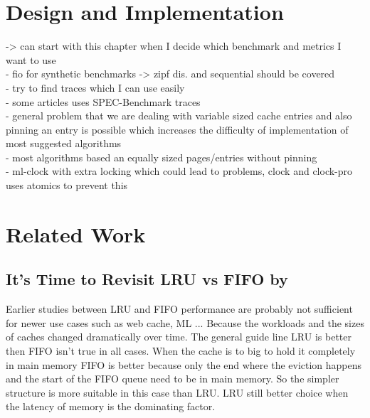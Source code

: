 \documentclass[
	12pt,
	a4paper,
	abstract,
	bibliography=totoc,
	chapterprefix,
	headings=openright,
	numbers=endperiod,
	parskip=half,
	twoside,
]{scrreprt}
\begin{document}
\chapter{Design and Implementation}
\label{cha:design and implementation}

-> can start with this chapter when I decide which benchmark and metrics I want to use\\
- fio for synthetic benchmarks -> zipf dis. and sequential should be covered\\
- try to find traces which I can use easily \\
- some articles uses SPEC-Benchmark traces\\

- general problem that we are dealing with variable sized cache entries and also \\
  pinning an entry is possible which increases the difficulty of implementation of most suggested algorithms\\
- most algorithms based an equally sized pages/entries without pinning\\
- ml-clock with extra locking which could lead to problems, clock and clock-pro uses atomics to prevent this


\chapter{Related Work}
\label{cha:related work}
%

\section*{It's Time to Revisit LRU vs FIFO by \cite{eytan2020s}}

Earlier studies between LRU and FIFO performance are probably not sufficient for newer use cases such as web cache, ML ...
Because the workloads and the sizes of caches changed dramatically over time.
The general guide line LRU is better then FIFO isn't true in all cases.
When the cache is to big to hold it completely in main memory FIFO is better because only the end where the eviction happens and the start of the FIFO queue need to be in main memory. So the simpler structure is more suitable in this case than LRU.
LRU still better choice when the latency of memory is the dominating factor.
\end{document}
